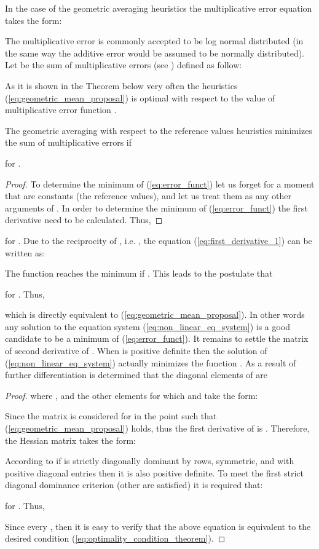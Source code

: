 In the case of the geometric averaging heuristics the multiplicative
error equation takes the form: 


The multiplicative error is commonly accepted to be log normal distributed
(in the same way the additive error would be assumed to be normally
distributed). Let  be
the sum of multiplicative errors (see \citep{Ishizaka2011rotm}) defined
as follow: 


As it is shown in the Theorem below very often the heuristics (\ref{eq:geometric_mean_proposal})
is optimal with respect to the value of multiplicative error function
. 
\begin{theorem}
The geometric averaging with respect to the reference values heuristics
minimizes the sum of multiplicative errors 
if 



for . \end{theorem}
\begin{proof}
To determine the minimum of (\ref{eq:error_funct}) let us forget
for a moment that  are constants
(the reference values), and let us treat them as any other arguments
of . In order to determine the minimum of (\ref{eq:error_funct})
the first derivative need to be calculated. Thus, 
\end{proof}

for . Due to the reciprocity of , i.e. ,
the equation (\ref{eq:first_derivative_1}) can be written as:




The function  reaches the minimum if .
This leads to the postulate that 

for . Thus, 

which is directly equivalent to (\ref{eq:geometric_mean_proposal}).
In other words any solution to the equation system (\ref{eq:non_linear_eq_system})
is a good candidate to be a minimum of (\ref{eq:error_funct}). It
remains to settle the matrix  of second derivative of . When
 is positive definite then the solution of (\ref{eq:non_linear_eq_system})
actually minimizes the function . As a result of further differentiation
is determined that the diagonal elements of  are 


\begin{proof}
where , and the other elements for which 
and  take the form:

Since the matrix  is considered for  in the point 
 such that (\ref{eq:geometric_mean_proposal})
holds, thus the first derivative of  is . Therefore, the Hessian
matrix  takes the form:

According to \citep[p. 29]{Quarteroni2000nm} if  is strictly
diagonally dominant by rows, symmetric, and with positive diagonal
entries then it is also positive definite. To meet the first strict
diagonal dominance criterion (other are satisfied) it is required
that:



for . Thus, 



Since every , then it is easy to verify that the above
equation is equivalent to the desired condition (\ref{eq:optimality_condition_theorem}). \end{proof}

